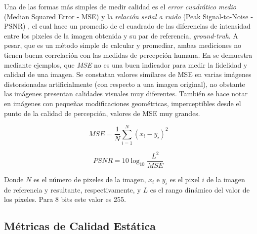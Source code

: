 Una de las formas más simples de medir calidad es el \emph{error cuadrático medio} (Median Squared Error - MSE) y la \emph{relación señal a ruido} (Peak Signal-to-Noise - PSNR) \cite{furht_handbook_2003} \cite{park_benchmark_2013}, el cual hace un promedio de el cuadrado de las diferencias de intensidad entre los pixeles de la imagen obtenida y su par de referencia, \emph{ground-truh}. A pesar, que es un método simple de calcular y promediar, ambas mediciones no tienen buena correlación con las medidas de percepción humana. En \cite{signal_zhou_2009} se demuestra mediante ejemplos, que \emph{MSE} no es una buen indicador para medir la fidelidad y calidad de una imagen. Se constatan valores similares de MSE en varias imágenes distorsionadas artificialmente (con respecto a una imagen original), no obstante las imágenes presentan calidades visuales muy diferentes.  También se hace notar en imágenes con pequeñas modificaciones geométricas, imperceptibles desde el punto de la calidad de percepción, valores de MSE muy grandes.

\begin{equation}
MSE=\frac{1}{N}\sum_{i=1}^N(x_{i}-y_{i})^2
\end{equation}

\begin{equation}
PSNR = 10\log_{10} {\frac{L^2}{MSE}}
\end{equation}

Donde $N$ es el número de pixeles de la imagen, $x_{i}$ e $y_{i}$ es el pixel $i$ de la imagen de referencia y resultante, respectivamente, y $L$ es el rango dinámico del valor de los pixeles. Para 8 bits este valor es 255.
 

\subsection{Métricas de Calidad Estática}

